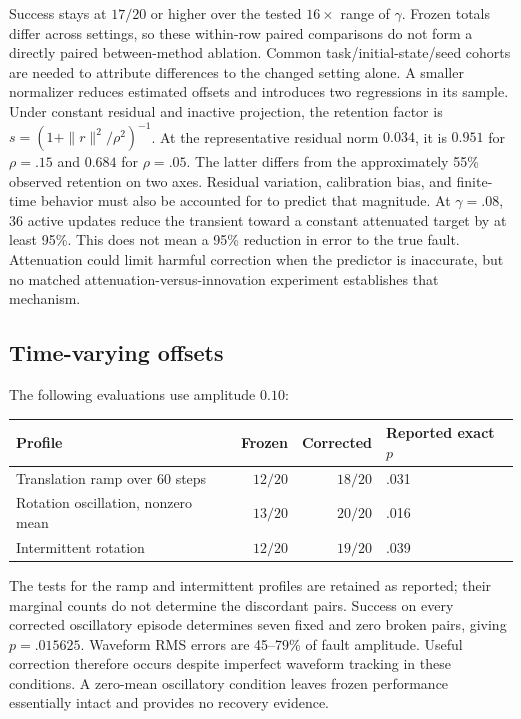 Success stays at $17/20$ or higher over the tested $16\times$ range of $\gamma$.
Frozen totals differ across settings, so these within-row paired comparisons do not
form a directly paired between-method ablation. Common task/initial-state/seed
cohorts are needed to attribute differences to the changed setting alone.
A smaller normalizer reduces estimated offsets and introduces two regressions in its
sample. Under constant residual and inactive projection, the retention factor is
$s=(1+\|r\|^2/\rho^2)^{-1}$. At the representative residual norm $0.034$, it
is $0.951$ for $\rho=.15$ and $0.684$ for $\rho=.05$. The latter differs from the
approximately 55\% observed retention on two axes. Residual variation, calibration
bias, and finite-time behavior must also be accounted for to predict that magnitude.
At $\gamma=.08$, 36 active updates reduce the transient toward a constant attenuated
target by at least 95\%. This does not mean a 95\% reduction in error to the true
fault. Attenuation could limit harmful correction when the predictor is inaccurate,
but no matched attenuation-versus-innovation experiment establishes that mechanism.

\subsection{Time-varying offsets}
\label{app:time}

The following evaluations use amplitude $0.10$:
\begin{center}\small
\begin{tabular}{lrrl}
\toprule
Profile & Frozen & Corrected & Reported exact $p$\\
\midrule
Translation ramp over 60 steps & $12/20$ & $18/20$ & .031\\
Rotation oscillation, nonzero mean & $13/20$ & $20/20$ & .016\\
Intermittent rotation & $12/20$ & $19/20$ & .039\\
\bottomrule
\end{tabular}
\end{center}
The tests for the ramp and intermittent profiles are retained as reported; their
marginal counts do not determine the discordant pairs. Success on every corrected
oscillatory episode determines seven fixed and zero broken pairs, giving
$p=.015625$. Waveform RMS errors are 45--79\% of fault amplitude. Useful correction
therefore occurs despite imperfect waveform tracking in these conditions. A zero-mean
oscillatory condition leaves frozen performance essentially intact and provides no
recovery evidence.

